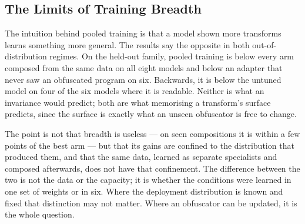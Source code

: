 \subsection{The Limits of Training Breadth}
The intuition behind pooled training is that a model shown more transforms learns something more
general. The results say the opposite in both out-of-distribution regimes. On the held-out family,
pooled training is below every arm composed from the same data on all eight models and below an
adapter that never saw an obfuscated program on six. Backwards, it is below the untuned model on four
of the six models where it is readable. Neither is what an invariance would predict; both are what
memorising a transform's surface predicts, since the surface is exactly what an unseen obfuscator is
free to change.

The point is not that breadth is useless --- on seen compositions it is within a few points of the
best arm --- but that its gains are confined to the distribution that produced them, and that the
same data, learned as separate specialists and composed afterwards, does not have that confinement.
The difference between the two is not the data or the capacity; it is whether the conditions were
learned in one set of weights or in six. Where the deployment distribution is known and fixed that
distinction may not matter. Where an obfuscator can be updated, it is the whole question.
